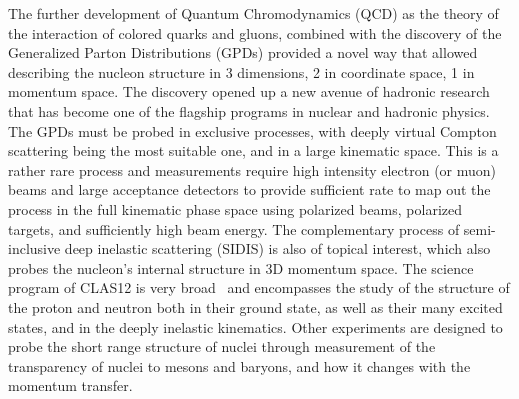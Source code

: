 \documentclass[final,3p,twocolumn]{elsarticle}
\begin{document}
The further development of Quantum Chromodynamics (QCD) as the theory of the interaction of colored quarks and gluons, combined with the discovery of the Generalized Parton Distributions (GPDs) provided a novel way that allowed describing the nucleon structure in 3 dimensions, 2 in coordinate space, 1 in momentum space. The discovery opened up a new avenue of hadronic research that has become one of the flagship programs in nuclear and hadronic physics. The GPDs must be probed in exclusive processes, with deeply virtual Compton scattering being the most suitable one, and in a large kinematic space. This is a rather rare process and measurements require high intensity electron (or muon) beams and large acceptance detectors to provide sufficient rate to map out the process in the full kinematic phase space using polarized beams, polarized targets, and sufficiently high beam energy. The complementary process of semi-inclusive deep inelastic scattering (SIDIS) is also of topical interest,  which also probes the nucleon's internal structure in 3D momentum space. The science program of CLAS12 is very broad~\cite{Burkert:2018nvj} and encompasses the study of the structure of the proton and neutron both in their ground state, as well as their many excited states, and in the deeply inelastic kinematics. Other experiments are designed to probe the short range structure of nuclei through measurement of the transparency of nuclei to mesons and baryons, and how it changes with the momentum transfer.   
\end{document}
